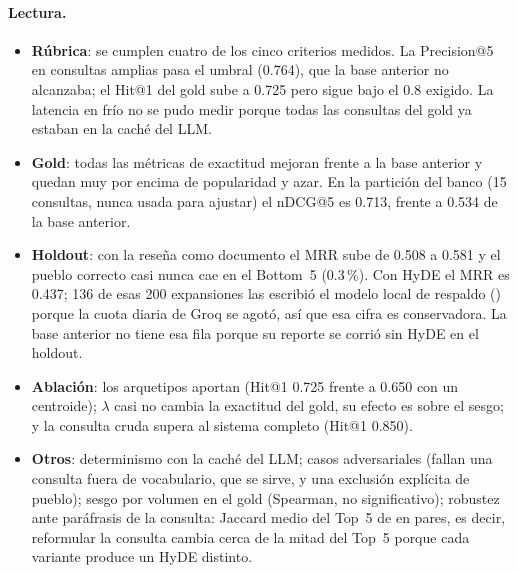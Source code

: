 \documentclass[11pt,a4paper]{article}
\newcommand{\cod}[1]{\texttt{\detokenize{#1}}}
\begin{document}
\paragraph{Lectura.}
\begin{itemize}
  \item \textbf{Rúbrica}: se cumplen cuatro de los cinco criterios medidos. La Precision@5 en
        consultas amplias pasa el umbral (0.764), que la base anterior no alcanzaba; el Hit@1 del
        gold sube a 0.725 pero sigue bajo el 0.8 exigido. La latencia en frío no se pudo medir
        porque todas las consultas del gold ya estaban en la caché del LLM.
  \item \textbf{Gold}: todas las métricas de exactitud mejoran frente a la base anterior y quedan
        muy por encima de popularidad y azar. En la partición \cod{test} del banco (15 consultas,
        nunca usada para ajustar) el nDCG@5 es 0.713, frente a 0.534 de la base anterior.
  \item \textbf{Holdout}: con la reseña como documento el MRR sube de 0.508 a 0.581 y el pueblo
        correcto casi nunca cae en el Bottom~5 (0.3\,\%). Con HyDE el MRR es 0.437; 136 de esas
        200 expansiones las escribió el modelo local de respaldo (\cod{qwen2.5:3b}) porque la
        cuota diaria de Groq se agotó, así que esa cifra es conservadora. La base anterior no
        tiene esa fila porque su reporte se corrió sin HyDE en el holdout.
  \item \textbf{Ablación}: los arquetipos aportan (Hit@1 0.725 frente a 0.650 con un centroide);
        $\lambda$ casi no cambia la exactitud del gold, su efecto es sobre el sesgo; y la consulta
        cruda supera al sistema completo (Hit@1 0.850).
  \item \textbf{Otros}: determinismo \determinismo{} con la caché del LLM; casos adversariales
        \adversarial{} (fallan una consulta fuera de vocabulario, que se sirve, y una exclusión
        explícita de pueblo); sesgo por volumen en el gold \sesgogold{} (Spearman, no
        significativo); robustez ante paráfrasis de la consulta: Jaccard medio del Top~5 de
        \robustez{} en \robustezpares{} pares, es decir, reformular la consulta cambia cerca de
        la mitad del Top~5 porque cada variante produce un HyDE distinto.
\end{itemize}
\end{document}

